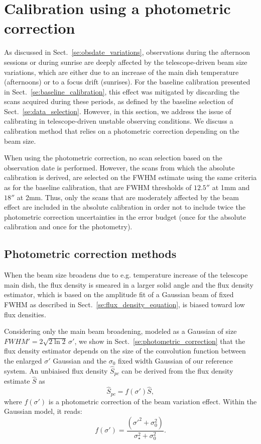 \section{Calibration using a photometric correction}%
\label{se:photocorr_calibration}

As discussed in Sect.~\ref{se:obsdate_variations}, observations during the
afternoon sessions or
during sunrise
are deeply affected by the telescope-driven beam
size variations, which are either due to an increase of the main dish
temperature (afternoons) or to a focus drift (sunrises).
For the baseline calibration presented in
Sect.~\ref{se:baseline_calibration}, this effect was mitigated by
discarding the scans acquired during these periods, as defined by the
baseline selection of Sect.~\ref{se:data_selection}. However, in
this section, we address the issue of calibrating in
telescope-driven unstable observing conditions. We discuss a
calibration method that relies on a photometric correction
depending on the beam size. 

When using the photometric correction, no scan selection based on the
observation date is performed. However, the scans from which the
absolute calibration is derived, are selected on the FWHM estimate
using the same criteria as for the baseline calibration, that are FWHM
thresholds of $12.5''$ at 1mm and $18''$ at 2mm.  Thus, only
the scans that are moderately affected by the beam effect are included
in the absolute calibration in order not to include twice the
photometric correction uncertainties in the error budget (once for the
absolute calibration and once for the photometry).


\subsection{Photometric correction methods}
\label{se:photocorr_methods}

When the beam size broadens due to e.g. temperature increase of the
telescope main dish, the flux density is smeared in a larger solid angle and
the flux density estimator, which is based on the amplitude fit of a
Gaussian beam of fixed FWHM as described in
Sect.~\ref{se:flux_density_equation}, is biased toward low flux densities.

Considering only the main beam broadening, modeled as a Gaussian of
size $FWHM' = 2 \sqrt{2\ln{2}} \, \sigma '$, we show in
Sect.~\ref{se:photometric_correction} that
the flux density estimator depends on the size of the convolution
function between the enlarged $\sigma '$ Gaussian and the 
$\sigma_0$ fixed width Gaussian of our reference system. An unbiaised
flux density $\hat{S}_{pc}$ can be derived from the flux density
estimate $\hat{S}$ as
\begin{equation}
  \hat{S}_{pc} = f(\sigma')\hat{S},
\end{equation}
where $f(\sigma')$ is a photometric correction of the beam variation
effect. Within the Gaussian model, it reads:
\begin{equation}
  f(\sigma') = \frac{(\sigma'^2 + \sigma_0^2)}{\sigma_{\star}^2 + \sigma_0^2}. 
\end{equation} 

